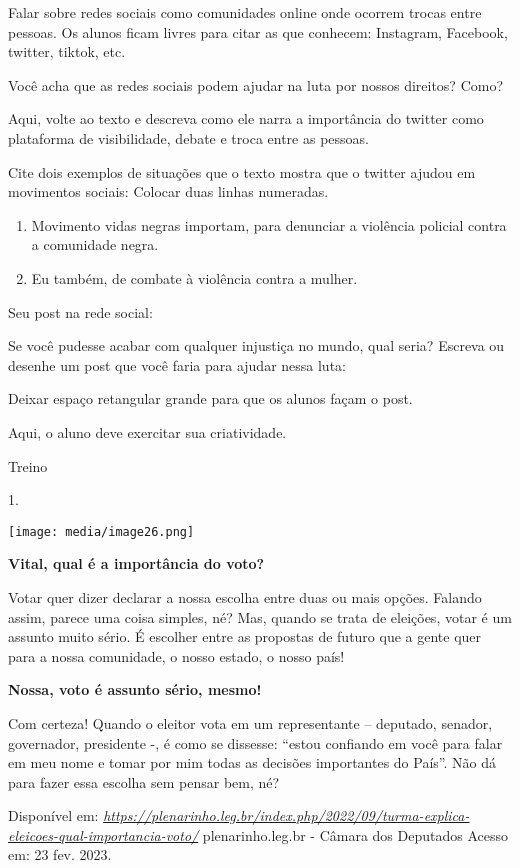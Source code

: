 Falar sobre redes sociais como comunidades online onde ocorrem trocas
entre pessoas. Os alunos ficam livres para citar as que conhecem:
Instagram, Facebook, twitter, tiktok, etc.

Você acha que as redes sociais podem ajudar na luta por nossos direitos?
Como?

Aqui, volte ao texto e descreva como ele narra a importância do twitter
como plataforma de visibilidade, debate e troca entre as pessoas.

Cite dois exemplos de situações que o texto mostra que o twitter ajudou
em movimentos sociais: Colocar duas linhas numeradas.

\begin{enumerate}
\def\labelenumi{\arabic{enumi}.}
\item
  Movimento vidas negras importam, para denunciar a violência policial
  contra a comunidade negra.
\item
  Eu também, de combate à violência contra a mulher.
\end{enumerate}

Seu post na rede social:

Se você pudesse acabar com qualquer injustiça no mundo, qual seria?
Escreva ou desenhe um post que você faria para ajudar nessa luta:

Deixar espaço retangular grande para que os alunos façam o post.

Aqui, o aluno deve exercitar sua criatividade.

Treino

1.

\texttt{[image: media/image26.png]}

\textbf{Vital, qual é a importância do voto? }

Votar quer dizer declarar a nossa escolha entre duas ou mais opções.
Falando assim, parece uma coisa simples, né? Mas, quando se trata de
eleições, votar é um assunto muito sério. É escolher entre as propostas
de futuro que a gente quer para a nossa comunidade, o nosso estado, o
nosso país!

\textbf{Nossa, voto é assunto sério, mesmo! }

Com certeza! Quando o eleitor vota em um representante -- deputado,
senador, governador, presidente -, é como se dissesse: ``estou confiando
em você para falar em meu nome e tomar por mim todas as decisões
importantes do País''. Não dá para fazer essa escolha sem pensar bem,
né?

Disponível em:
\href{https://plenarinho.leg.br/index.php/2022/09/turma-explica-eleicoes-qual-importancia-voto/}{\emph{https://plenarinho.leg.br/index.php/2022/09/turma-explica-eleicoes-qual-importancia-voto/}}
plenarinho.leg.br - Câmara dos Deputados Acesso em: 23 fev. 2023.

